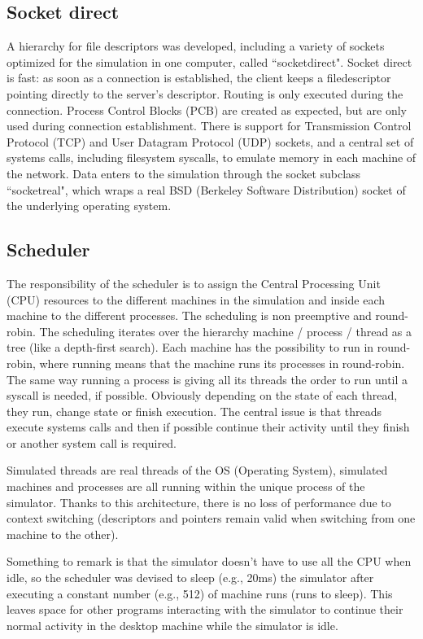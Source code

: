 \documentclass{llncs}
\begin{document}
\subsection{Socket direct}

A hierarchy for file descriptors was developed, including a variety of sockets optimized for the simulation 
in one computer, called ``socketdirect".
Socket direct is fast:  as soon as a connection is established, the client keeps a filedescriptor
pointing directly to the server's descriptor. Routing is only executed during the connection.
Process Control Blocks (PCB) are created as expected, but are only used during connection establishment.
There is support for 
Transmission Control Protocol (TCP) and 
User Datagram Protocol (UDP) sockets, and a central set of systems calls, 
including filesystem syscalls, to emulate memory in each machine of the network.
 Data enters to the simulation through the socket subclass ``socketreal", 
which wraps a real 
BSD (Berkeley Software Distribution) socket of the underlying operating system.


\subsection{Scheduler}

The responsibility of the scheduler is to assign the 
Central Processing Unit (CPU) resources to the different machines
in the simulation and inside each machine to the different processes.
The scheduling is non preemptive and round-robin. 
The scheduling iterates over the hierarchy machine / process / thread as a tree
(like a depth-first search). 
Each machine has the possibility to run in round-robin,
 where running means that the machine runs its processes in round-robin.
 The same way running a process is giving all its threads the order to run until a syscall is needed, if possible. 
 Obviously depending on the state of each thread, they run, change state or finish execution. 
The central issue is that threads execute systems calls and then if possible continue their activity until they finish
 or another system call is required. 

Simulated threads are real threads of the OS (Operating System), simulated machines and
 processes are all running within the unique process of the simulator.
Thanks to this architecture, there is no loss of performance due to context switching
(descriptors and pointers remain valid when switching from one machine to the other).

Something to remark is that the simulator doesn't have to use all the CPU when idle, so the scheduler was
 devised to sleep (e.g., 20ms) the simulator after executing a constant number (e.g., 512) of machine runs (runs to sleep). 
This leaves space for other programs interacting with the simulator to continue their normal activity in the desktop machine
while the simulator is idle.
\end{document}
